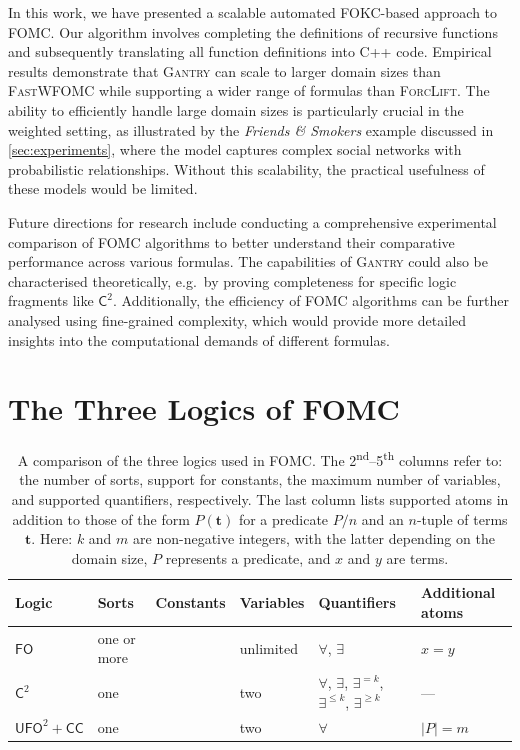 \documentclass[a4paper,UKenglish,cleveref, autoref, thm-restate]{lipics-v2021}
\newcommand{\cmark}{\ding{51}}
\newcommand{\xmark}{\ding{55}}
\newcommand{\Ctwo}{$\mathsf{C}^{2}$}
\newcommand{\FO}{$\mathsf{FO}$}
\newcommand{\UFO}{$\mathsf{UFO}^{2} + \mathsf{CC}$}
\newcommand{\Cranetwo}{\textsc{Gantry}}
\newcommand{\friends}{\emph{Friends \& Smokers}}
\begin{document}
In this work, we have presented a scalable automated FOKC-based approach to
FOMC\@. Our algorithm involves completing the definitions of recursive functions
and subsequently translating all function definitions into C++ code. Empirical
results demonstrate that \Cranetwo{} can scale to larger domain sizes than
\textsc{FastWFOMC} while supporting a wider range of formulas than
\textsc{ForcLift}. The ability to efficiently handle large domain sizes is
particularly crucial in the weighted setting, as illustrated by the \friends{}
example discussed in \cref{sec:experiments}, where the model captures complex
social networks with probabilistic relationships. Without this scalability, the
practical usefulness of these models would be limited.

Future directions for research include conducting a comprehensive experimental
comparison of FOMC algorithms to better understand their comparative performance
across various formulas. The capabilities of \Cranetwo{} could also be
characterised theoretically, e.g.\ by proving completeness for specific logic
fragments like \Ctwo{}. Additionally, the efficiency of FOMC algorithms can be
further analysed using fine-grained complexity, which would provide more
detailed insights into the computational demands of different formulas.



\appendix
\section{The Three Logics of FOMC}\label{sec:threelogics}

\begin{table}[t]
  \centering
  \begin{tabular}{llclll}
    \toprule
    Logic & Sorts & Constants & Variables & Quantifiers & Additional atoms\\
    \midrule
    \FO & one or more & \cmark & unlimited & $\forall$, $\exists$ & $x = y$\\
    \Ctwo & one & \xmark & two & $\forall$, $\exists$, $\exists^{= k}$, $\exists^{\le k}$, $\exists^{\ge k}$ & ---\\
    \UFO & one & \xmark & two & $\forall$ & $|P| = m$\\
    \bottomrule
  \end{tabular}
  \caption{A comparison of the three logics used in FOMC\@. The
    2\textsuperscript{nd}--5\textsuperscript{th} columns refer to: the number of
    sorts, support for constants, the maximum number of variables, and supported
    quantifiers, respectively. The last column lists supported atoms in addition
    to those of the form $P(\mathbf{t})$ for a predicate $P/n$ and an $n$-tuple
    of terms $\mathbf{t}$. Here: $k$ and $m$ are non-negative integers, with the
    latter depending on the domain size, $P$ represents a predicate, and $x$ and
    $y$ are terms. }\label{tbl:logics}
\end{table}
\end{document}
